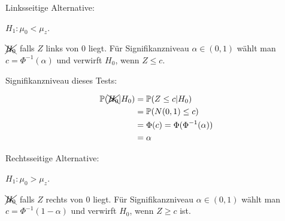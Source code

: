 \documentclass{tstextbook}
\begin{document}
\begin{example}
	Linksseitige Alternative:
	
	$ H_1\colon \mu_0<\mu_z $.
	
	$ \xcancel{H_0} $ falls $ Z $ links von 0 liegt. Für Signifikanzniveau $ \alpha\in(0,1)$ wählt man $ c=\Phi^{-1}\left(\alpha\right) $ und verwirft $H_0$, wenn $ Z \le c $.
	
	Signifikanzniveau dieses Tests:
	
	\[
	\begin{aligned}
	    \mathbb P(\xcancel{H_0}|H_0) & = \mathbb P(Z\le c|H_0) \\
	    & = \mathbb P(N(0,1)\le c) \\
	    & = \Phi(c) = \Phi(\Phi^{-1}(\alpha)) \\
	    & = \alpha
	\end{aligned}
	\]
	
	\begin{center}
	\end{center}
	
	Rechtsseitige Alternative:
	
	$ H_1\colon \mu_0>\mu_z $.
	
	$ \xcancel{H_0} $ falls $ Z $ rechts von 0 liegt. Für Signifikanzniveau $ \alpha\in(0,1) $ wählt man $ c=\Phi^{-1}\left(1-\alpha\right) $ und verwirft $H_0$, wenn $ Z \ge c $ ist.
	

\end{example}
\end{document}
